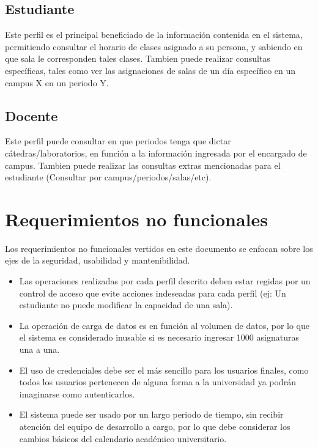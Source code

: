 \documentclass[a4paper,10pt]{article}
\begin{document}
\subsection{Estudiante}

Este perfil es el principal beneficiado de la información contenida en el sistema, permitiendo consultar el horario de clases asignado a su persona, y sabiendo en que sala le corresponden tales clases. Tambien puede realizar consultas específicas, tales como ver las asignaciones de salas de un día específico en un campus X en un periodo Y.

\subsection{Docente}

Este perfil puede consultar en que periodos tenga que dictar cátedras/laboratorios, en función a la información ingresada por el encargado de campus. Tambien puede realizar las consultas extras mencionadas para el estudiante (Consultar por campus/periodos/salas/etc).

\section{Requerimientos no funcionales}

Los requerimientos no funcionales vertidos en este documento se enfocan sobre los ejes de la seguridad, usabilidad y mantenibilidad.

\begin{itemize}
  \item Las operaciones realizadas por cada perfil descrito deben estar regidas por un control de acceso que evite acciones indeseadas para cada perfil (ej: Un estudiante no puede modificar la capacidad de una sala).
  \item La operación de carga de datos es en función al volumen de datos, por lo que el sistema es considerado inusable si es necesario ingresar 1000 asignaturas una a una.
  \item El uso de credenciales debe ser el más sencillo para los usuarios finales, como todos los usuarios pertenecen de alguna forma a la universidad ya podrán imaginarse como autenticarlos.
  \item El sistema puede ser usado por un largo periodo de tiempo, sin recibir atención del equipo de desarrollo a cargo, por lo que debe considerar los cambios básicos del calendario académico universitario.

\end{itemize}
\end{document}

